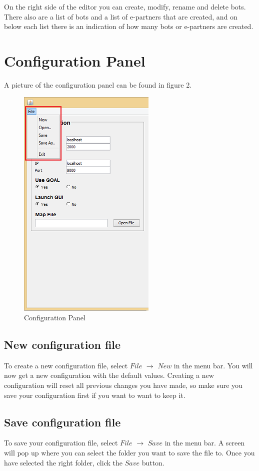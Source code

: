 \documentclass[a4paper]{article}
\begin{document}
On the right side of the editor you can create, modify, rename and delete bots. There also are a list of bots and a list of e-partners that are created, and on below each list there is an indication of how many bots or e-partners are created.
\pagebreak
\section{Configuration Panel}
A picture of the configuration panel can be found in figure 2.
\begin{figure}
\begin{center}
\includegraphics{config.png}
\end{center}
\caption{Configuration Panel}
\end{figure}
\subsection{New configuration file}
To create a new configuration file, select $File$ $\to$ $New$ in the menu bar. You will now get a new configuration with the default values. Creating a new configuration will reset all previous changes you have made, so make sure you save your configuration first if you want to want to keep it.

\subsection{Save configuration file}
To save your configuration file, select $File$ $\to$ $Save$ in the menu bar. A screen will pop up where you can select the folder you want to save the file to. Once you have selected the right folder, click the $Save$ button.
\end{document}
